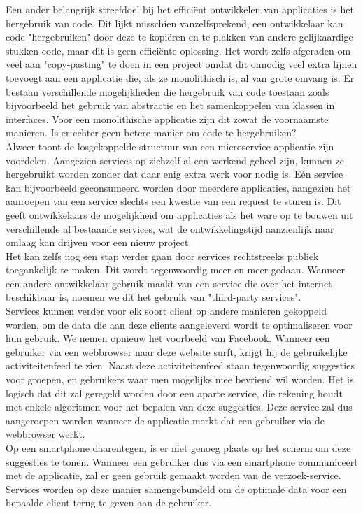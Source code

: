 Een ander belangrijk streefdoel bij het efficiënt ontwikkelen van applicaties is het hergebruik van code. Dit lijkt misschien vanzelfsprekend, een ontwikkelaar kan code "hergebruiken" door deze te kopiëren en te plakken van andere gelijkaardige stukken code, maar dit is geen efficiënte oplossing. Het wordt zelfs afgeraden om veel aan "copy-pasting" te doen in een project omdat dit onnodig veel extra lijnen toevoegt aan een applicatie die, als ze monolithisch is, al van grote omvang is. Er bestaan verschillende mogelijkheden die hergebruik van code toestaan zoals bijvoorbeeld het gebruik van abstractie en het samenkoppelen van klassen in interfaces. Voor een monolithische applicatie zijn dit zowat de voornaamste manieren. Is er echter geen betere manier om code te hergebruiken?
\\
Alweer toont de losgekoppelde structuur van een microservice applicatie zijn voordelen. Aangezien services op zichzelf al een werkend geheel zijn, kunnen ze hergebruikt worden zonder dat daar enig extra werk voor nodig is. Eén service kan bijvoorbeeld geconsumeerd worden door meerdere applicaties, aangezien het aanroepen van een service slechts een kwestie van een request te sturen is. Dit geeft ontwikkelaars de mogelijkheid om applicaties als het ware op te bouwen uit verschillende al bestaande services, wat de ontwikkelingstijd aanzienlijk naar omlaag kan drijven voor een nieuw project.
\\
Het kan zelfs nog een stap verder gaan door services rechtstreeks publiek toegankelijk te maken. Dit wordt tegenwoordig meer en meer gedaan. Wanneer een andere ontwikkelaar gebruik maakt van een service die over het internet beschikbaar is, noemen we dit het gebruik van "third-party services".
\\
Services kunnen verder voor elk soort client op andere manieren gekoppeld worden, om de data die aan deze clients aangeleverd wordt te optimaliseren voor hun gebruik. We nemen opnieuw het voorbeeld van Facebook. Wanneer een gebruiker via een webbrowser naar deze website surft, krijgt hij de gebruikelijke activiteitenfeed te zien. Naast deze activiteitenfeed staan tegenwoordig suggesties voor groepen, en gebruikers waar men mogelijks mee bevriend wil worden. Het is logisch dat dit zal geregeld worden door een aparte service, die rekening houdt met enkele algoritmen voor het bepalen van deze suggesties. Deze service zal dus aangeroepen worden wanneer de applicatie merkt dat een gebruiker via de webbrowser werkt. 
\\
Op een smartphone daarentegen, is er niet genoeg plaats op het scherm om deze suggesties te tonen. Wanneer een gebruiker dus via een smartphone communiceert met de applicatie, zal er geen gebruik gemaakt worden van de verzoek-service. Services worden op deze manier samengebundeld om de optimale data voor een bepaalde client terug te geven aan de gebruiker.

